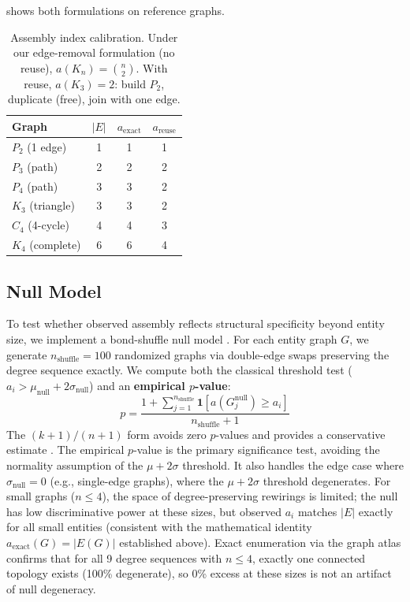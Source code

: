 \documentclass[letterpaper]{article}
\begin{document}
 shows both formulations on reference graphs.

\begin{table}[t]
    \centering
    \begin{tabular}{lccc}
        \toprule
        Graph & $|E|$ & $a_{\text{exact}}$ & $a_{\text{reuse}}$ \\
        \midrule
        $P_2$ (1 edge)    & 1 & 1 & 1 \\
        $P_3$ (path)      & 2 & 2 & 2 \\
        $P_4$ (path)      & 3 & 3 & 2 \\
        $K_3$ (triangle)  & 3 & 3 & 2 \\
        $C_4$ (4-cycle)   & 4 & 4 & 3 \\
        $K_4$ (complete)  & 6 & 6 & 4 \\
        \bottomrule
    \end{tabular}
    \caption{
        Assembly index calibration. Under our edge-removal formulation
        (no reuse), $a(K_n) = \binom{n}{2}$. With reuse, $a(K_3) = 2$:
        build $P_2$, duplicate (free), join with one edge.
    }
    \label{tab:calibration}
\end{table}

\subsection{Null Model}

To test whether observed assembly reflects structural specificity beyond
entity size, we implement a bond-shuffle null model
\citep{gotelli1996nullmodels}. For each entity graph $G$, we generate
$n_{\text{shuffle}} = 100$ randomized graphs via double-edge swaps
\citep{hagberg2008networkx} preserving the degree sequence exactly. We
compute both the classical threshold test ($a_i > \mu_{\text{null}} +
2\sigma_{\text{null}}$) and an \textbf{empirical $p$-value}:
\begin{equation}
    p = \frac{1 + \sum_{j=1}^{n_{\text{shuffle}}}
    \mathbf{1}[a(G_j^{\text{null}}) \geq a_i]}{n_{\text{shuffle}} + 1}
\end{equation}
The $(k{+}1)/(n{+}1)$ form avoids zero $p$-values and provides a
conservative estimate \citep{gotelli1996nullmodels}. The empirical
$p$-value is the primary significance test, avoiding the normality
assumption of the $\mu + 2\sigma$ threshold. It also handles the edge
case where $\sigma_{\text{null}} = 0$ (e.g., single-edge graphs), where
the $\mu + 2\sigma$ threshold degenerates. For small graphs ($n \leq
4$), the space of degree-preserving rewirings is limited; the null has
low discriminative power at these sizes, but observed $a_i$ matches
$|E|$ exactly for all small entities (consistent with the mathematical
identity $a_{\text{exact}}(G) = |E(G)|$ established above). Exact enumeration via the graph atlas \citep{read1998atlas} confirms
that for all 9 degree sequences with $n \leq 4$, exactly one connected
topology exists (100\% degenerate), so 0\% excess at these sizes is
not an artifact of null degeneracy.
\end{document}
